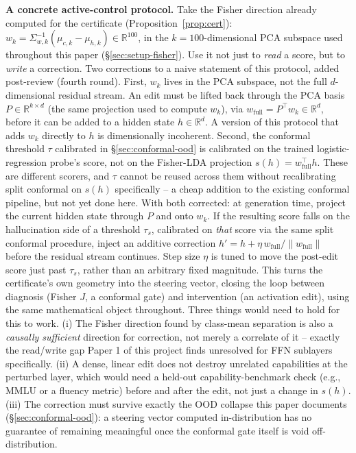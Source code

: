 \documentclass[onecolumn]{jmlr}
\begin{document}
\textbf{A concrete active-control protocol.} Take the Fisher direction
already computed for the certificate (Proposition~\ref{prop:cert}):
$w_k = \Sigma_{w,k}^{-1}(\mu_{c,k} - \mu_{h,k}) \in \mathbb{R}^{100}$,
in the $k{=}100$-dimensional PCA subspace used throughout this paper
(\S\ref{sec:setup-fisher}). Use it not just to \emph{read} a score, but
to \emph{write} a correction. Two corrections to a naive statement of
this protocol, added post-review (fourth round). First, $w_k$ lives in
the PCA subspace, not the full $d$-dimensional residual stream. An edit
must be lifted back through the PCA basis $P \in \mathbb{R}^{k \times
d}$ (the same projection used to compute $w_k$), via $w_{\text{full}} =
P^\top w_k \in \mathbb{R}^d$, before it can be added to a hidden state
$h \in \mathbb{R}^d$. A version of this protocol that adds $w_k$
directly to $h$ is dimensionally incoherent. Second, the conformal
threshold $\tau$ calibrated in \S\ref{sec:conformal-ood} is calibrated
on the trained logistic-regression probe's score, not on the
Fisher-LDA projection $s(h) = w_{\text{full}}^\top h$. These are
different scorers, and $\tau$ cannot be reused across them without
recalibrating split conformal on $s(h)$ specifically -- a cheap
addition to the existing conformal pipeline, but not yet done here.
With both corrected: at generation time, project the current hidden
state through $P$ and onto $w_k$. If the resulting score falls on the
hallucination side of a threshold $\tau_s$, calibrated on \emph{that}
score via the same split conformal procedure, inject an additive
correction $h' = h + \eta \, w_{\text{full}} / \|w_{\text{full}}\|$
before the residual stream continues. Step size $\eta$ is tuned to move
the post-edit score just past $\tau_s$, rather than an arbitrary fixed
magnitude. This turns the certificate's own geometry into the steering
vector, closing the loop between diagnosis (Fisher $J$, a conformal
gate) and intervention (an activation edit), using the same
mathematical object throughout. Three things would need to hold for
this to work. (i) The Fisher direction found by class-mean separation
is also a \emph{causally sufficient} direction for correction, not
merely a correlate of it -- exactly the read/write gap Paper 1 of this
project finds unresolved for FFN sublayers specifically. (ii) A dense,
linear edit does not destroy unrelated capabilities at the perturbed
layer, which would need a held-out capability-benchmark check (e.g.,
MMLU or a fluency metric) before and after the edit, not just a change
in $s(h)$. (iii) The correction must survive exactly the OOD collapse
this paper documents (\S\ref{sec:conformal-ood}): a steering vector
computed in-distribution has no guarantee of remaining meaningful once
the conformal gate itself is void off-distribution.
\end{document}

